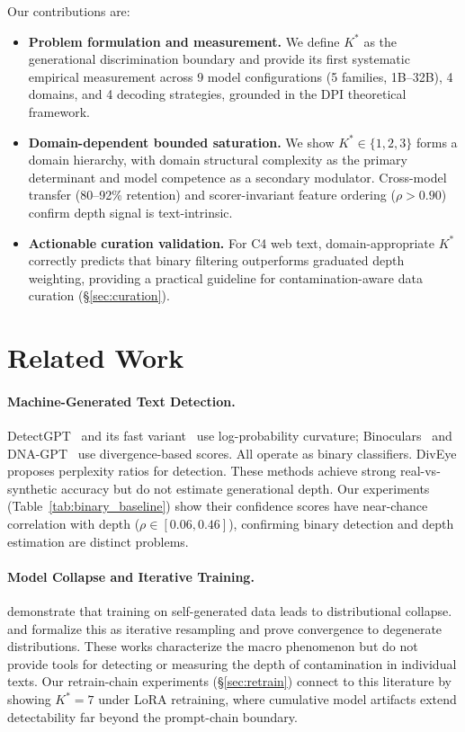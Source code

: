 \documentclass[11pt,a4paper]{article}
\begin{document}
Our contributions are:
\begin{itemize}
    \item \textbf{Problem formulation and measurement.} We define $K^*$ as the generational discrimination boundary and provide its first systematic empirical measurement across 9 model configurations (5 families, 1B--32B), 4 domains, and 4 decoding strategies, grounded in the DPI theoretical framework.
    \item \textbf{Domain-dependent bounded saturation.} We show $K^*\!\in\!\{1,2,3\}$ forms a domain hierarchy, with domain structural complexity as the primary determinant and model competence as a secondary modulator. Cross-model transfer (80--92\% retention) and scorer-invariant feature ordering ($\rho\!>\!0.90$) confirm depth signal is text-intrinsic.
    \item \textbf{Actionable curation validation.} For C4 web text, domain-appropriate $K^*$ correctly predicts that binary filtering outperforms graduated depth weighting, providing a practical guideline for contamination-aware data curation (\S\ref{sec:curation}).
\end{itemize}


\section{Related Work}

\paragraph{Machine-Generated Text Detection.}
DetectGPT~\citep{mitchell2023detectgpt} and its fast variant~\citep{bao2024fast} use log-probability curvature; Binoculars~\citep{hans2024binoculars} and DNA-GPT~\citep{yang2023dnagpt} use divergence-based scores. All operate as binary classifiers. DivEye proposes perplexity ratios for detection. These methods achieve strong real-vs-synthetic accuracy but do not estimate generational depth. Our experiments (Table~\ref{tab:binary_baseline}) show their confidence scores have near-chance correlation with depth ($\rho\!\in\![0.06, 0.46]$), confirming binary detection and depth estimation are distinct problems.

\paragraph{Model Collapse and Iterative Training.}
\citet{shumailov2024model} demonstrate that training on self-generated data leads to distributional collapse. \citet{alemohammad2024selfconsuming} and \citet{dohmatob2024model} formalize this as iterative resampling and prove convergence to degenerate distributions. These works characterize the macro phenomenon but do not provide tools for detecting or measuring the depth of contamination in individual texts. Our retrain-chain experiments (\S\ref{sec:retrain}) connect to this literature by showing $K^*\!=\!7$ under LoRA retraining, where cumulative model artifacts extend detectability far beyond the prompt-chain boundary.
\end{document}
